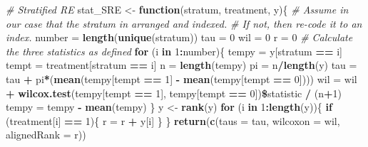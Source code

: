 \documentclass[]{article}
\newenvironment{Shaded}{\begin{snugshade}}{\end{snugshade}}
\newcommand{\KeywordTok}[1]{\textcolor[rgb]{0.13,0.29,0.53}{\textbf{#1}}}
\newcommand{\DataTypeTok}[1]{\textcolor[rgb]{0.13,0.29,0.53}{#1}}
\newcommand{\DecValTok}[1]{\textcolor[rgb]{0.00,0.00,0.81}{#1}}
\newcommand{\StringTok}[1]{\textcolor[rgb]{0.31,0.60,0.02}{#1}}
\newcommand{\CommentTok}[1]{\textcolor[rgb]{0.56,0.35,0.01}{\textit{#1}}}
\newcommand{\ControlFlowTok}[1]{\textcolor[rgb]{0.13,0.29,0.53}{\textbf{#1}}}
\newcommand{\OperatorTok}[1]{\textcolor[rgb]{0.81,0.36,0.00}{\textbf{#1}}}
\newcommand{\NormalTok}[1]{#1}
\begin{document}
\begin{Shaded}
\begin{Highlighting}[]
\CommentTok{# Stratified RE}
\NormalTok{stat_SRE <-}\StringTok{ }\ControlFlowTok{function}\NormalTok{(stratum, treatment, y)\{}
  \CommentTok{# Assume in our case that the stratum in arranged and indexed.}
  \CommentTok{# If not, then re-code it to an index.}
\NormalTok{  number =}\StringTok{ }\KeywordTok{length}\NormalTok{(}\KeywordTok{unique}\NormalTok{(stratum))}
\NormalTok{  tau =}\StringTok{ }\DecValTok{0}
\NormalTok{  wil =}\StringTok{ }\DecValTok{0}
\NormalTok{  r =}\StringTok{ }\DecValTok{0}
  \CommentTok{# Calculate the three statistics as defined}
  \ControlFlowTok{for}\NormalTok{ (i }\ControlFlowTok{in} \DecValTok{1}\OperatorTok{:}\NormalTok{number)\{}
\NormalTok{    tempy =}\StringTok{ }\NormalTok{y[stratum }\OperatorTok{==}\StringTok{ }\NormalTok{i]}
\NormalTok{    tempt =}\StringTok{ }\NormalTok{treatment[stratum }\OperatorTok{==}\StringTok{ }\NormalTok{i]}
\NormalTok{    n =}\StringTok{ }\KeywordTok{length}\NormalTok{(tempy)}
\NormalTok{    pi =}\StringTok{ }\NormalTok{n}\OperatorTok{/}\KeywordTok{length}\NormalTok{(y)}
\NormalTok{    tau =}\StringTok{ }\NormalTok{tau }\OperatorTok{+}\StringTok{ }\NormalTok{pi}\OperatorTok{*}\NormalTok{(}\KeywordTok{mean}\NormalTok{(tempy[tempt }\OperatorTok{==}\StringTok{ }\DecValTok{1}\NormalTok{] }\OperatorTok{-}\StringTok{ }\KeywordTok{mean}\NormalTok{(tempy[tempt }\OperatorTok{==}\StringTok{ }\DecValTok{0}\NormalTok{])))}
\NormalTok{    wil =}\StringTok{ }\NormalTok{wil }\OperatorTok{+}\StringTok{ }\KeywordTok{wilcox.test}\NormalTok{(tempy[tempt }\OperatorTok{==}\StringTok{ }\DecValTok{1}\NormalTok{], tempy[tempt }\OperatorTok{==}\StringTok{ }\DecValTok{0}\NormalTok{])}\OperatorTok{\$}\NormalTok{statistic }\OperatorTok{/}\StringTok{ }\NormalTok{(n}\OperatorTok{+}\DecValTok{1}\NormalTok{)}
\NormalTok{    tempy =}\StringTok{ }\NormalTok{tempy }\OperatorTok{-}\StringTok{ }\KeywordTok{mean}\NormalTok{(tempy)}
\NormalTok{  \}}
\NormalTok{  y <-}\StringTok{ }\KeywordTok{rank}\NormalTok{(y)}
  \ControlFlowTok{for}\NormalTok{ (i }\ControlFlowTok{in} \DecValTok{1}\OperatorTok{:}\KeywordTok{length}\NormalTok{(y))\{}
    \ControlFlowTok{if}\NormalTok{ (treatment[i] }\OperatorTok{==}\StringTok{ }\DecValTok{1}\NormalTok{)\{}
\NormalTok{      r =}\StringTok{ }\NormalTok{r }\OperatorTok{+}\StringTok{ }\NormalTok{y[i]}
\NormalTok{    \}}
\NormalTok{  \}}
  \KeywordTok{return}\NormalTok{(}\KeywordTok{c}\NormalTok{(}\DataTypeTok{taus =}\NormalTok{ tau, }\DataTypeTok{wilcoxon =}\NormalTok{ wil, }\DataTypeTok{alignedRank =}\NormalTok{ r))}

\end{Highlighting}
\end{Shaded}
\end{document}
